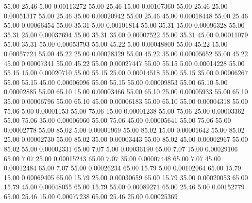      55.00     25.46      5.00     0.00113272
     55.00     25.46     15.00     0.00107360
     55.00     25.46     25.00     0.00051317
     55.00     25.46     35.00     0.00020942
     55.00     25.46     45.00     0.00018448
     55.00     25.46     55.00     0.00066454
     55.00     35.31      5.00     0.00101814
     55.00     35.31     15.00     0.00096328
     55.00     35.31     25.00     0.00037694
     55.00     35.31     35.00     0.00007522
     55.00     35.31     45.00     0.00011079
     55.00     35.31     55.00     0.00053793
     55.00     45.22      5.00     0.00048800
     55.00     45.22     15.00     0.00057724
     55.00     45.22     25.00     0.00028329
     55.00     45.22     35.00     0.00005652
     55.00     45.22     45.00     0.00007341
     55.00     45.22     55.00     0.00027447
     55.00     55.15      5.00     0.00014228
     55.00     55.15     15.00     0.00020710
     55.00     55.15     25.00     0.00014518
     55.00     55.15     35.00     0.00006267
     55.00     55.15     45.00     0.00006096
     55.00     55.15     55.00     0.00009853
     55.00     65.10      5.00     0.00002885
     55.00     65.10     15.00     0.00003466
     55.00     65.10     25.00     0.00005933
     55.00     65.10     35.00     0.00006796
     55.00     65.10     45.00     0.00006183
     55.00     65.10     55.00     0.00004318
     55.00     75.06      5.00     0.00001153
     55.00     75.06     15.00     0.00001238
     55.00     75.06     25.00     0.00003362
     55.00     75.06     35.00     0.00006060
     55.00     75.06     45.00     0.00005641
     55.00     75.06     55.00     0.00002778
     55.00     85.02      5.00     0.00001969
     55.00     85.02     15.00     0.00001642
     55.00     85.02     25.00     0.00002730
     55.00     85.02     35.00     0.00003443
     55.00     85.02     45.00     0.00002967
     55.00     85.02     55.00     0.00002331
     65.00      7.07      5.00     0.00036190
     65.00      7.07     15.00     0.00029106
     65.00      7.07     25.00     0.00015243
     65.00      7.07     35.00     0.00007448
     65.00      7.07     45.00     0.00012484
     65.00      7.07     55.00     0.00026234
     65.00     15.79      5.00     0.00102064
     65.00     15.79     15.00     0.00069405
     65.00     15.79     25.00     0.00030659
     65.00     15.79     35.00     0.00020053
     65.00     15.79     45.00     0.00048055
     65.00     15.79     55.00     0.00089271
     65.00     25.46      5.00     0.00152779
     65.00     25.46     15.00     0.00077238
     65.00     25.46     25.00     0.00025369
